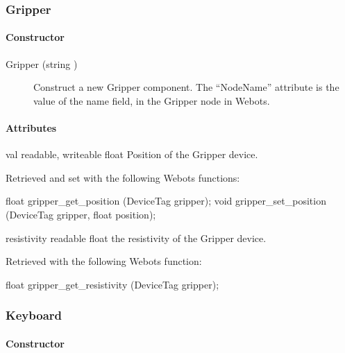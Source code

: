 \subsubsection{Gripper}

\paragraph{Constructor}

\noindent
\begin{description}
\item[{Gripper (string )}] Construct a new Gripper
  component. The ``NodeName'' attribute is the value of the name
  field, in the Gripper node in Webots.

\end{description}

\paragraph{Attributes}

\noindent
\begin{itemize}
\begin{attribute}{val}
  {readable, writeable}
  {float}
  {}
  Position of the Gripper device.

  Retrieved and set with the following Webots functions:

\begin{cxx}
float gripper_get_position  (DeviceTag gripper);
void gripper_set_position  (DeviceTag gripper, float position);
\end{cxx}
\end{attribute}

\begin{attribute}{resistivity}
  {readable}
  {float}
  {}
  the resistivity of the Gripper device.

  Retrieved with the following Webots function:

\begin{cxx}
float gripper_get_resistivity  (DeviceTag gripper);
\end{cxx}
\end{attribute}

\end{itemize}

\subsubsection{Keyboard}

\paragraph{Constructor}

